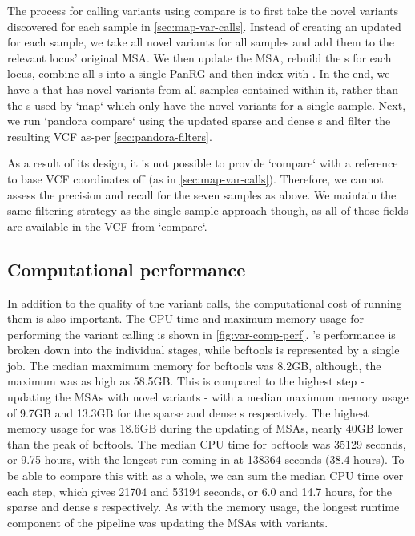 The process for calling variants using compare is to first take the novel variants discovered for each sample in \autoref{sec:map-var-calls}. Instead of creating an updated \prg{} for each sample, we take all novel variants for all samples and add them to the relevant locus' original MSA. We then update the MSA, rebuild the \prg{}s for each locus, combine all \prg{}s into a single PanRG and then index with \pandora{}. In the end, we have a \prg{} that has novel variants from all samples contained within it, rather than the \prg{}s used by `map` which only have the novel variants for a single sample.
Next, we run `pandora compare` using the updated sparse and dense \prg{}s and filter the resulting VCF as-per \autoref{sec:pandora-filters}.

As a result of its design, it is not possible to provide `compare` with a reference to base VCF coordinates off (as in \autoref{sec:map-var-calls}). Therefore, we cannot assess the precision and recall for the seven samples as above. We maintain the same filtering strategy as the single-sample approach though, as all of those fields are available in the VCF from `compare`.

\subsection{Computational performance}

In addition to the quality of the variant calls, the computational cost of running them is also important. The CPU time and maximum memory usage for performing the \ont{} variant calling is shown in \autoref{fig:var-comp-perf}. \pandora{}'s performance is broken down into the individual stages, while bcftools is represented by a single job. The median maxmimum memory for bcftools was 8.2GB, although, the maximum was as high as 58.5GB. This is compared to the highest \pandora{} step - updating the MSAs with novel variants - with a median maximum memory usage of 9.7GB and 13.3GB for the sparse and dense \prg{}s respectively. The highest memory usage for \pandora{} was 18.6GB during the updating of MSAs, nearly 40GB lower than the peak of bcftools. The median CPU time for bcftools was 35129 seconds, or 9.75 hours, with the longest run coming in at 138364 seconds (38.4 hours). To be able to compare this with \pandora{} as a whole, we can sum the median CPU time over each step, which gives 21704 and 53194 seconds, or 6.0 and 14.7 hours, for the sparse and dense \prg{}s respectively. As with the memory usage, the longest runtime component of the \pandora{} pipeline was updating the MSAs with \denovo{} variants.

